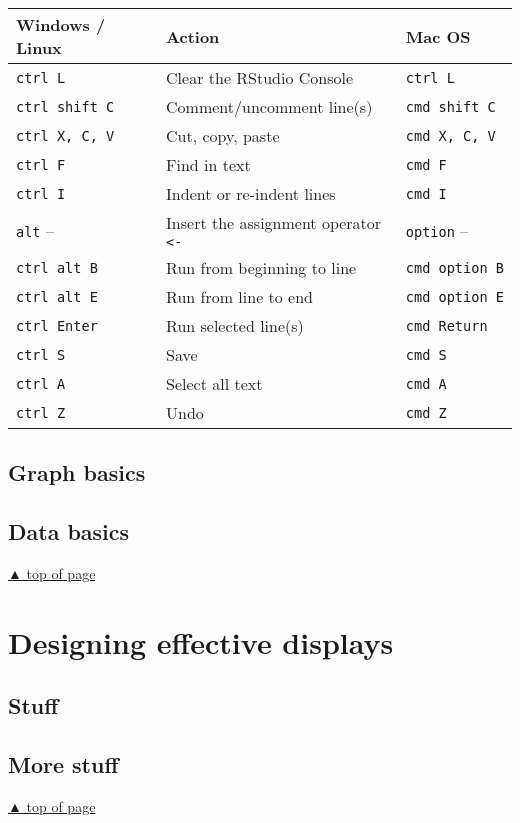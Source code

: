 \documentclass[
]{book}
\begin{document}
\begin{longtable}[]{@{}lll@{}}
\toprule
Windows / Linux & Action & Mac OS \\
\midrule
\endhead
\texttt{ctrl\ L} & Clear the RStudio Console & \texttt{ctrl\ L} \\
\texttt{ctrl\ shift\ C} & Comment/uncomment line(s) & \texttt{cmd\ shift\ C} \\
\texttt{ctrl\ X,\ C,\ V} & Cut, copy, paste & \texttt{cmd\ X,\ C,\ V} \\
\texttt{ctrl\ F} & Find in text & \texttt{cmd\ F} \\
\texttt{ctrl\ I} & Indent or re-indent lines & \texttt{cmd\ I} \\
\texttt{alt} -- & Insert the assignment operator \texttt{\textless{}-} & \texttt{option} -- \\
\texttt{ctrl\ alt\ B} & Run from beginning to line & \texttt{cmd\ option\ B} \\
\texttt{ctrl\ alt\ E} & Run from line to end & \texttt{cmd\ option\ E} \\
\texttt{ctrl\ Enter} & Run selected line(s) & \texttt{cmd\ Return} \\
\texttt{ctrl\ S} & Save & \texttt{cmd\ S} \\
\texttt{ctrl\ A} & Select all text & \texttt{cmd\ A} \\
\texttt{ctrl\ Z} & Undo & \texttt{cmd\ Z} \\
\bottomrule
\end{longtable}

\hypertarget{graph-basics}{%
\section{Graph basics}\label{graph-basics}}

\hypertarget{data-basics}{%
\section{Data basics}\label{data-basics}}

\protect\hyperlink{start-with-R}{▲ top of page}

\hypertarget{display-design}{%
\chapter{Designing effective displays}\label{display-design}}

\hypertarget{stuff-2}{%
\section{Stuff}\label{stuff-2}}

\hypertarget{more-stuff-2}{%
\section{More stuff}\label{more-stuff-2}}

\protect\hyperlink{display-design}{▲ top of page}

  
\end{document}
